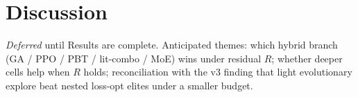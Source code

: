 \section{Discussion}
\label{sec:discussion}

\textit{Deferred} until Results are complete. Anticipated themes: which hybrid branch (GA / PPO / PBT / lit-combo / MoE) wins under residual $R$; whether deeper cells help when $R$ holds; reconciliation with the v3 finding that light evolutionary explore beat nested loss-opt elites under a smaller budget.
